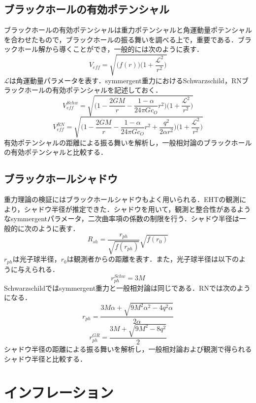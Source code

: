 \subsection{ブラックホールの有効ポテンシャル}
ブラックホールの有効ポテンシャルは重力ポテンシャルと角運動量ポテンシャルを合わせたもので，ブラックホールの振る舞いを調べる上で，重要である．ブラックホール解から導くことができ，一般的には次のように表す．
\begin{equation}
    V_{eff}=\sqrt{\big( f(r) \big) \bigg( 1+\frac{\mathcal{L}^2}{r^2}\bigg) }
\end{equation}
$\mathcal{L}$は角運動量パラメータを表す．symmergent重力におけるSchwarzschild，RNブラックホールの有効ポテンシャルを記述しておく．
\begin{dmath}
    V^{Schw}_{eff}=\sqrt{\bigg( 1-\frac{2GM}{r}-\frac{1-\alpha}{24\pi Gc_O}r^2 \bigg) \bigg( 1+\frac{\mathcal{L}^2}{r^2}\bigg) }
\end{dmath}
\begin{dmath}
    V^{RN}_{eff}=\sqrt{\bigg( 1-\frac{2GM}{r}-\frac{1-\alpha}{24\pi Gc_O}r^2+\frac{q^2}{2\alpha r^2} \bigg) \bigg( 1+\frac{\mathcal{L}^2}{r^2}\bigg) }
\end{dmath}
有効ポテンシャルの距離による振る舞いを解析し，一般相対論のブラックホールの有効ポテンシャルと比較する．
\subsection{ブラックホールシャドウ}
重力理論の検証にはブラックホールシャドウもよく用いられる．EHTの観測により，シャドウ半径が推定できた．シャドウを用いて，観測と整合性があるようなsymmergentパラメータ，二次曲率項の係数の制限を行う．シャドウ半径は一般的に次のように表す．
\begin{dmath}
    R_{sh}=\frac{r_{ph}}{\sqrt{f(r_{ph})}}\sqrt{f(r_0)}
\end{dmath}
$r_{ph}$は光子球半径，$r_0$は観測者からの距離を表す．また，光子球半径は以下のように与えられる．
\begin{dmath}
    r^{Schw}_{ph}=3M
\end{dmath}
Schwarzschildではsymmergent重力と一般相対論は同じである．RNでは次のようになる．
\begin{dmath}
    r_{ph}=\frac{3M\alpha+\sqrt{9M^2\alpha^2-4q^2\alpha}}{2\alpha}
\end{dmath}
\begin{dmath}
    r^{GR}_{ph}=\frac{3M+\sqrt{9M^2-8q^2}}{2}
\end{dmath}
シャドウ半径の距離による振る舞いを解析し，一般相対論および観測で得られるシャドウ半径と比較する．
\section{インフレーション}
\cite{1970586434916889216,Planck:2018jri}
